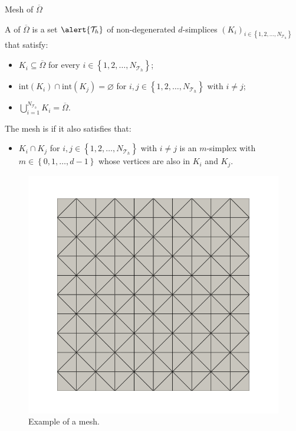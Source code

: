\begin{frame}[allowframebreaks]{Mesh of $\overline{\Omega}$}

\begin{definicion}
	A  of $\overline{\Omega}$ is a set $\alert{\mathcal{T}_h}$ of non-degenerated $d$-simplices $\left(K_i\right)_{i\in\left\{1,2,\ldots,N_{\mathcal{T}_h}\right\}}$ that satisfy:
	\begin{itemize}
		\item $K_i\subseteq\overline\Omega$ for every $i\in\left\{1,2,\ldots,N_{\mathcal{T}_h}\right\}$;
		\item $\text{int}\left(K_i\right)\cap\text{int}\left(K_j\right)=\varnothing$ for $i,j\in\left\{1,2,\ldots,N_{\mathcal{T}_h} \right\}$ with $i\neq j$;
		\item $\displaystyle \bigcup_{i=1}^{N_{\mathcal{T}_h}} K_i=\overline\Omega$.
	\end{itemize}	
	The mesh is  if it also satisfies that:
	\begin{itemize}
		\item $K_i\cap K_j$ for $i,j\in\left\{1,2,\ldots,N_{\mathcal{T}_h} \right\}$ with $i\neq j$ is an $m$-simplex with $m\in\left\{0,1,\ldots,d-1 \right\}$ whose vertices are also in $K_i$ and $K_j$.
	\end{itemize}
\end{definicion}

\begin{figure}
	\centering
	\includegraphics[scale=0.3]{img/mesh.png}
	\caption{Example of a mesh.}
\end{figure}

\end{frame}

